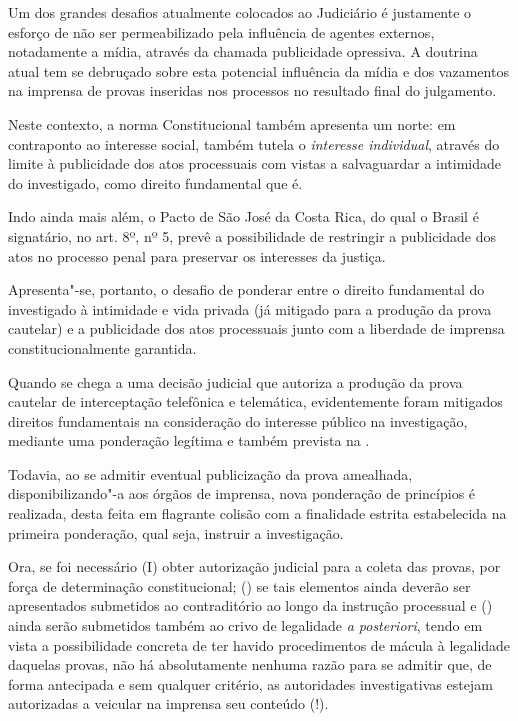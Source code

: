 Um dos grandes desafios atualmente colocados ao Judiciário é justamente
o esforço de não ser permeabilizado pela influência de agentes externos,
notadamente a mídia, através da chamada publicidade opressiva. A
doutrina atual tem se debruçado sobre esta potencial influência da mídia
e dos vazamentos na imprensa de provas inseridas nos processos no
resultado final do julgamento.

Neste contexto, a norma Constitucional também apresenta um norte: em
contraponto ao interesse social, também tutela o \emph{interesse
individual}, através do limite à publicidade dos atos processuais com
vistas a salvaguardar a intimidade do investigado, como direito
fundamental que é.

Indo ainda mais além, o Pacto de São José da Costa Rica, do qual o
Brasil é signatário, no art. 8º, nº 5, prevê a possibilidade de
restringir a publicidade dos atos no processo penal para preservar os
interesses da justiça.

Apresenta"-se, portanto, o desafio de ponderar entre o direito
fundamental do investigado à intimidade e vida privada (já mitigado para
a produção da prova cautelar) e a publicidade dos atos processuais junto
com a liberdade de imprensa constitucionalmente garantida.

Quando se chega a uma decisão judicial que autoriza a produção da prova
cautelar de interceptação telefônica e telemática, evidentemente foram
mitigados direitos fundamentais na consideração do interesse público na
investigação, mediante uma ponderação legítima e também prevista na .

Todavia, ao se admitir eventual publicização da prova amealhada,
disponibilizando"-a aos órgãos de imprensa, nova ponderação de princípios
é realizada, desta feita em flagrante colisão com a finalidade estrita
estabelecida na primeira ponderação, qual seja, instruir a investigação.

Ora, se foi necessário (I) obter autorização judicial para a coleta das
provas, por força de determinação constitucional; () se tais elementos
ainda deverão ser apresentados submetidos ao contraditório ao longo da
instrução processual e () ainda serão submetidos também ao crivo de
legalidade \emph{a posteriori}, tendo em vista a possibilidade concreta
de ter havido procedimentos de mácula à legalidade daquelas provas, não
há absolutamente nenhuma razão para se admitir que, de forma antecipada
e sem qualquer critério, as autoridades investigativas estejam
autorizadas a veicular na imprensa seu conteúdo (!).

